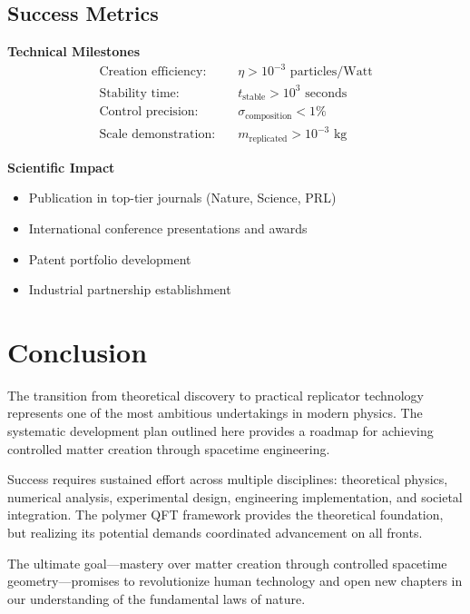 \documentclass[11pt]{article}
\begin{document}
\subsection{Success Metrics}

\textbf{Technical Milestones}
\begin{align}
\text{Creation efficiency:} &\quad \eta > 10^{-3} \text{ particles/Watt} \\
\text{Stability time:} &\quad t_{\text{stable}} > 10^{3} \text{ seconds} \\
\text{Control precision:} &\quad \sigma_{\text{composition}} < 1\% \\
\text{Scale demonstration:} &\quad m_{\text{replicated}} > 10^{-3} \text{ kg}
\end{align}

\textbf{Scientific Impact}
\begin{itemize}
\item Publication in top-tier journals (Nature, Science, PRL)
\item International conference presentations and awards
\item Patent portfolio development
\item Industrial partnership establishment
\end{itemize}

\section{Conclusion}

The transition from theoretical discovery to practical replicator technology represents one of the most ambitious undertakings in modern physics. The systematic development plan outlined here provides a roadmap for achieving controlled matter creation through spacetime engineering.

Success requires sustained effort across multiple disciplines: theoretical physics, numerical analysis, experimental design, engineering implementation, and societal integration. The polymer QFT framework provides the theoretical foundation, but realizing its potential demands coordinated advancement on all fronts.

The ultimate goal—mastery over matter creation through controlled spacetime geometry—promises to revolutionize human technology and open new chapters in our understanding of the fundamental laws of nature.
\end{document}
